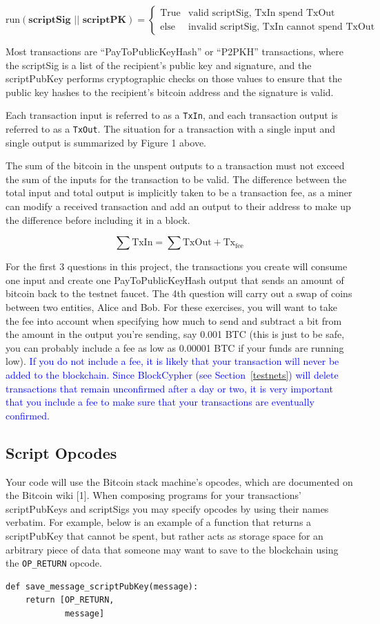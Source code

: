 \documentclass[11pt]{article}
\begin{document}
\[
  \text{run}(\textbf{scriptSig } || \textbf{ scriptPK}) =
  \begin{cases}
      \text{True} & \text{valid scriptSig, TxIn spend TxOut} \\
      \text{else} & \text{invalid scriptSig, TxIn cannot spend TxOut}
   \end{cases}
\]

Most transactions are ``PayToPublicKeyHash'' or ``P2PKH'' transactions, where the scriptSig is a list of the recipient's public key and signature, and the scriptPubKey performs cryptographic checks on those values to ensure that the public key hashes to the recipient's bitcoin address and the signature is valid.

Each transaction input is referred to as a \texttt{TxIn}, and each transaction output is referred to as a \texttt{TxOut}. The situation for a transaction with a single input and single output is summarized by Figure 1 above.

The sum of the bitcoin in the unspent outputs to a transaction must not exceed the sum of the inputs for the transaction to be valid. The difference between the total input and total output is implicitly taken to be a transaction fee, as a miner can modify a received transaction and add an output to their address to make up the difference before including it in a block.

\[\sum \text{TxIn} = \sum \text{TxOut} + \text{Tx}_{\text{fee}}\]

For the first 3 questions in this project, the transactions you create will consume one input and create one PayToPublicKeyHash output that sends an amount of bitcoin back to the testnet faucet. The 4th question will carry out a swap of coins between two entities, Alice and Bob. For these exercises, you will want to take the fee into account when specifying how much to send and subtract a bit from the amount in the output you're sending, say 0.001 BTC (this is just to be safe, you can probably include a fee as low as 0.00001 BTC if your funds are running low). \textcolor{blue}{If you do not include a fee, it is likely that your transaction will never be added to the blockchain. Since BlockCypher (see Section~\ref{testnets}) will delete transactions that remain unconfirmed after a day or two, it is very important that you include a fee to make sure that your transactions are eventually confirmed.}

\subsection{Script Opcodes}
Your code will use the Bitcoin stack machine's opcodes, which are documented on the Bitcoin wiki [1]. When composing programs for your transactions' scriptPubKeys and scriptSigs you may specify opcodes by using their names verbatim. For example, below is an example of a function that returns a scriptPubKey that cannot be spent, but rather acts as storage space for an arbitrary piece of data that someone may want to save to the blockchain using the \texttt{OP\_RETURN} opcode.
\begin{verbatim}
def save_message_scriptPubKey(message):
    return [OP_RETURN,
            message]
\end{verbatim}
\end{document}
